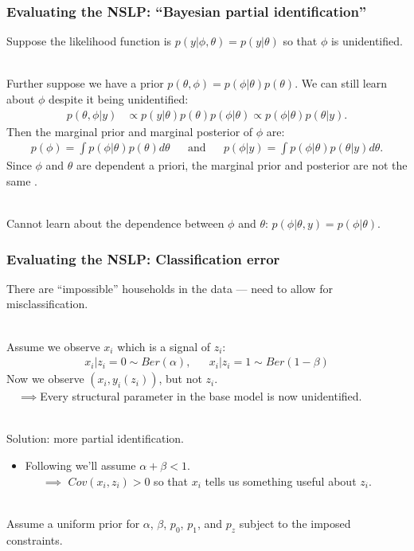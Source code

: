 \documentclass[xcolor=dvipsnames]{beamer}
\begin{document}
\begin{frame}
\frametitle{Evaluating the NSLP: ``Bayesian partial identification''}
Suppose the likelihood function is $p(y|\phi,\theta)=p(y|\theta)$ so that $\phi$ is unidentified.\\~

Further suppose we have a prior $p(\theta,\phi)=p(\phi|\theta)p(\theta)$. \pause We can still learn about $\phi$ despite it being unidentified:
    \begin{align*}
    p(\theta,\phi|y) &\propto p(y|\theta)p(\theta)p(\phi|\theta) \propto p(\phi|\theta)p(\theta|y).
  \end{align*}
\pause Then the marginal prior and marginal posterior of $\phi$ are:
    \begin{align*}
    p(\phi) = \int p(\phi|\theta)p(\theta)d\theta  &&\mbox{and}&& p(\phi|y) = \int p(\phi|\theta)p(\theta|y)d\theta.
  \end{align*}
Since $\phi$ and $\theta$ are dependent a priori, the marginal prior and posterior are not the same \citep{poirier1998revising}.\\~

\pause Cannot learn about the dependence between $\phi$ and $\theta$: $p(\phi|\theta,y)=p(\phi|\theta)$.

\end{frame}


\begin{frame}
  \frametitle{Evaluating the NSLP: Classification error}
There are ``impossible'' households in the data --- need to allow for misclassification.\\~

\pause Assume we observe $x_i$ which is a signal of $z_i$:
\begin{align*}
  x_i|z_i=0 \sim Ber(\alpha),&&  x_i|z_i=1 \sim Ber(1-\beta)
\end{align*}
\pause Now we observe $(x_i,y_i(z_i))$, but not $z_i$.\\
\ \ $\implies$Every structural parameter in the base model is now unidentified. \\~

\pause Solution: more partial identification.
\pause \begin{itemize}
\item[] Following \cite{bollinger2009bayesian} we'll assume $\alpha + \beta <1$.\\
\ \ \ $\implies$ $Cov(x_i,z_i)>0$ so that $x_i$ tells us something useful about $z_i$.\\~\\
\end{itemize}


\pause Assume a uniform prior for $\alpha$, $\beta$, $p_0$, $p_1$, and $p_z$ subject to the imposed constraints.
\end{frame}
\end{document}
